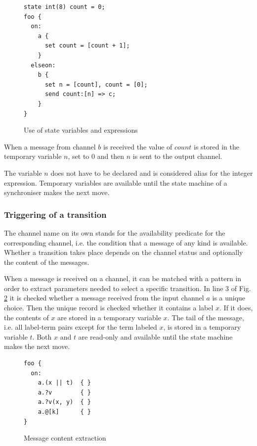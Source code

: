 \begin{figure}[h!]
\lstset{numbers=left, numberstyle=\small, stepnumber=1, numbersep=8pt}
\begin{lstlisting}[frame=single]
state int(8) count = 0;
foo {
  on:
    a {
      set count = [count + 1];
    }
  elseon:
    b {
      set n = [count], count = [0];
      send count:[n] => c;
    }
}
\end{lstlisting}
\caption{Use of state variables and expressions}
\label{sync_state_exp}
\end{figure}

When a message from channel $b$ is received the value of $count$ is stored in the temporary variable $n$, set to 0 and then $n$ is sent to the output channel.

The variable $n$ does not have to be declared and is considered alias for the integer expression. Temporary variables are available until the state machine of a synchroniser makes the next move.


  \subsubsection{Triggering of a transition}
The channel name on its own stands for the availability predicate for the corresponding channel, i.e. the condition that a message of any kind is available. Whether a transition takes place depends on the channel status and optionally the content of the messages.

When a message is received on a channel, it can be matched with a pattern in order to extract parameters needed to select a specific transition. In line 3 of Fig. \ref{sync_trans} it is checked whether a message received from the input channel $a$ is a unique choice. Then the unique record is checked whether it contains a label $x$. If it does, the contents of $x$ are stored in a temporary variable $x$. The tail of the message, i.e. all label-term pairs except for the term labeled $x$, is stored in a temporary variable $t$. Both $x$ and $t$ are read-only and available until the state machine makes the next move.

\begin{figure}[h!]
\lstset{numbers=left, numberstyle=\small, stepnumber=1, numbersep=8pt}
\begin{lstlisting}[frame=single]
foo {
  on:
    a.(x || t)  { }
    a.?v        { }
    a.?v(x, y)  { }
    a.@[k]      { }
}
\end{lstlisting}
\caption{Message content extraction}
\label{sync_trans}
\end{figure}

